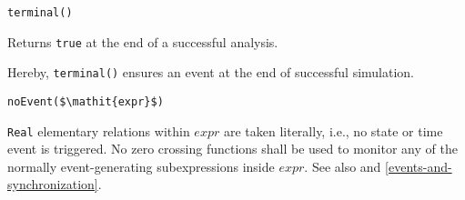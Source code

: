 \begin{operatordefinition}[terminal]
\begin{synopsis}\begin{lstlisting}
terminal()
\end{lstlisting}\end{synopsis}
\begin{semantics}
Returns \lstinline!true! at the end of a successful analysis.
\begin{nonnormative}
Hereby, \lstinline!terminal()! ensures an event at the end of successful simulation.
\end{nonnormative}
\end{semantics}
\end{operatordefinition}

\begin{operatordefinition}[noEvent]
\begin{synopsis}\begin{lstlisting}
noEvent($\mathit{expr}$)
\end{lstlisting}\end{synopsis}
\begin{semantics}
\lstinline!Real! elementary relations within $\mathit{expr}$ are taken literally, i.e., no state or time event is triggered.  No zero crossing functions shall be used to monitor any of the normally event-generating subexpressions inside $\mathit{expr}$.  See also  and \cref{events-and-synchronization}.
\end{semantics}
\end{operatordefinition}


